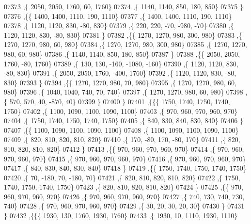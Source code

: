 \begin{DoxyCode}
07373     ,\{  2050,  2050,  1760,    60,  1760\}
07374     ,\{  1140,  1140,   850,   180,   850\}
07375     \}
07376    ,\{\{  1400,  1400,  1110,   190,  1110\}
07377     ,\{  1400,  1400,  1110,   190,  1110\}
07378     ,\{  1120,  1120,   830,   -80,   830\}
07379     ,\{   220,   220,   -70,  -980,   -70\}
07380     ,\{  1120,  1120,   830,   -80,   830\}
07381     \}
07382    ,\{\{  1270,  1270,   980,   300,   980\}
07383     ,\{  1270,  1270,   980,    60,   980\}
07384     ,\{  1270,  1270,   980,   300,   980\}
07385     ,\{  1270,  1270,   980,    60,   980\}
07386     ,\{  1140,  1140,   850,   180,   850\}
07387     \}
07388    ,\{\{  2050,  2050,  1760,   -80,  1760\}
07389     ,\{   130,   130,  -160, -1080,  -160\}
07390     ,\{  1120,  1120,   830,   -80,   830\}
07391     ,\{  2050,  2050,  1760,  -400,  1760\}
07392     ,\{  1120,  1120,   830,   -80,   830\}
07393     \}
07394    ,\{\{  1270,  1270,   980,    70,   980\}
07395     ,\{  1270,  1270,   980,    60,   980\}
07396     ,\{  1040,  1040,   740,    70,   740\}
07397     ,\{  1270,  1270,   980,    60,   980\}
07398     ,\{   570,   570,    40,  -870,    40\}
07399     \}
07400    \}
07401   ,\{\{\{  1750,  1740,  1750,  1740,  1750\}
07402     ,\{  1100,  1090,  1100,  1090,  1100\}
07403     ,\{   970,   960,   970,   960,   970\}
07404     ,\{  1750,  1740,  1750,  1740,  1750\}
07405     ,\{   840,   830,   840,   830,   840\}
07406     \}
07407    ,\{\{  1100,  1090,  1100,  1090,  1100\}
07408     ,\{  1100,  1090,  1100,  1090,  1100\}
07409     ,\{   820,   810,   820,   810,   820\}
07410     ,\{   170,   -80,   170,   -80,   170\}
07411     ,\{   820,   810,   820,   810,   820\}
07412     \}
07413    ,\{\{   970,   960,   970,   960,   970\}
07414     ,\{   970,   960,   970,   960,   970\}
07415     ,\{   970,   960,   970,   960,   970\}
07416     ,\{   970,   960,   970,   960,   970\}
07417     ,\{   840,   830,   840,   830,   840\}
07418     \}
07419    ,\{\{  1750,  1740,  1750,  1740,  1750\}
07420     ,\{    70,  -180,    70,  -180,    70\}
07421     ,\{   820,   810,   820,   810,   820\}
07422     ,\{  1750,  1740,  1750,  1740,  1750\}
07423     ,\{   820,   810,   820,   810,   820\}
07424     \}
07425    ,\{\{   970,   960,   970,   960,   970\}
07426     ,\{   970,   960,   970,   960,   970\}
07427     ,\{   740,   730,   740,   730,   740\}
07428     ,\{   970,   960,   970,   960,   970\}
07429     ,\{    30,    20,    30,    20,    30\}
07430     \}
07431    \}
07432   ,\{\{\{  1930,   130,  1760,  1930,  1760\}
07433     ,\{  1930,    10,  1110,  1930,  1110\}

\end{DoxyCode}
